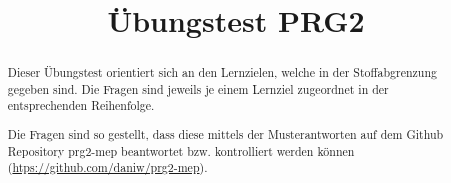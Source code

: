 \documentclass[a4paper, 11pt, fleqn]{article}
\title{Übungstest PRG2}
\begin{document}
\maketitle

\newpage

\begin{abstract}
Dieser Übungstest orientiert sich an den Lernzielen, welche in der
Stoffabgrenzung gegeben sind. Die Fragen sind jeweils je einem
Lernziel zugeordnet in der entsprechenden Reihenfolge. 

Die Fragen sind so gestellt, dass diese mittels der Musterantworten
auf dem Github Repository prg2-mep beantwortet bzw. kontrolliert 
werden können (\url{htps://github.com/daniw/prg2-mep}).
\end{abstract}

\vfill{}

\tableofcontents


\end{document}
